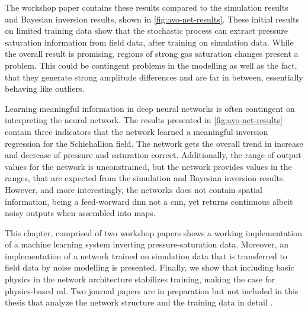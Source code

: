 
The workshop paper \citet{dramsch2019deep} contains these results compared to the simulation results and Bayesian inversion results, shown in \cref{fig:avo-net-results}. These initial results on limited training data show that the stochastic process can extract pressure saturation information from field data, after training on simulation data. While the overall result is promising, regions of strong gas saturation changes present a problem. This could be contingent problems in the modelling as well as the fact, that they generate strong amplitude differences and are far in between, essentially behaving like outliers. 

Learning meaningful information in deep neural networks is often contingent on interpreting the neural network. The results presented in \cref{fig:avo-net-results} contain three indicators that the network learned a meaningful inversion regression for the Schiehallion field. The network gets the overall trend in increase and decrease of pressure and saturation correct. Additionally, the range of output values for the network is unconstrained, but the network provides values in the ranges, that are expected from the simulation and Bayesian inversion results.  However, and more interestingly, the networks does not contain spatial information, being a feed-worward \ac{dnn} not a \ac{cnn}, yet returns continuous albeit noisy outputs when assembled into maps.

This chapter, comprised of two workshop papers shows a working implementation of a machine learning system inverting pressure-saturation data. Moreover, an implementation of a network trained on simulation data that is transferred to field data by noise modelling is presented. Finally, we show that including basic physics in the network architecture stabilizes training, making the case for physics-based \acl{ml}. Two journal papers are in preparation but not included in this thesis that analyze the network structure and the training data in detail \citep{corte2019exploring,dramsch2020physics}. 



